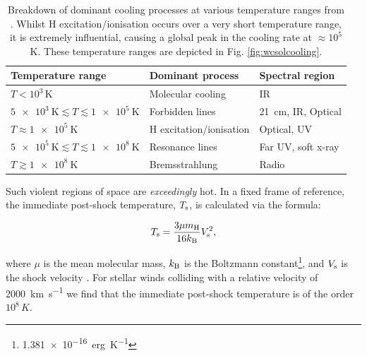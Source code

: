 \begin{table}[h]
  \centering
  \begin{tabular}{lll}
  \hline 
  Temperature range & Dominant process & Spectral region \\
  \hline
  $T < 10^3 \, \si{\kelvin}$ & Molecular cooling & IR \\
  $\SI{5e3}{\kelvin} \lesssim T \lesssim \SI{1e5}{\kelvin} $ & Forbidden lines & \SI{21}{cm}, IR, Optical \\
  $T \approx \SI{1e5}{\kelvin}$ & H excitation/ionisation & Optical, UV \\
  $\SI{5e5}{\kelvin} \lesssim T \lesssim \SI{1e8}{\kelvin} $ & Resonance lines & Far UV, soft x-ray \\
  $T \gtrsim \SI{1e8}{\kelvin} $ & Bremsstrahlung & Radio \\ \hline
  \end{tabular}
  \caption[Cooling processes at various temperature ranges]{Breakdown of dominant cooling processes at various temperature ranges from \textcite[Ch.~6]{dysonPhysicsInterstellarMedium2021}. Whilst H excitation/ionisation occurs over a very short temperature range, it is extremely influential, causing a global peak in the cooling rate at $\approx 10^5$ \si{\kelvin}. These temperature ranges are depicted in Fig. \ref{fig:wcsolcooling}.}
  \label{tab:coolprocess}
\end{table}

Such violent regions of space are \emph{exceedingly} hot.
In a fixed frame of reference, the immediate post-shock temperature, $T_\text{s}$, is calculated via the formula:

\begin{equation}
  \label{eq:idealgasch2}
  T_\text{s} = \frac{3\mu m_\text{H}}{16 k_\text{B}} V_\text{s}^2 ,
\end{equation}

\noindent
where $\mu$ is the mean molecular mass, $k_\text{B}$ is the Boltzmann constant\footnote{\SI{1.381e-16}{erg.K^{-1}}}, and $V_\text{s}$ is the shock velocity
\parencite[Ch.~9]{macielHydrodynamicsStellarWinds2014}.
For stellar winds colliding with a relative velocity of \SI{2000}{\kilo\metre\per\second} we find that the immediate post-shock temperature is of the order $10^8\,\si{K}$.

